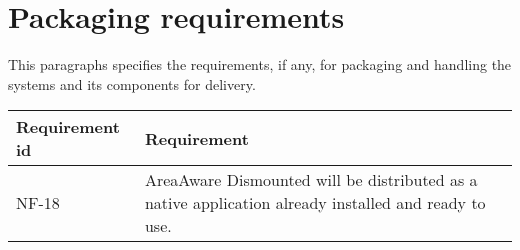 
\newpage
\section{Packaging requirements}
This paragraphs specifies the requirements, if any, for packaging and handling the systems and its components for delivery.

\begin{longtable}{| p{3.2cm} |  p{10cm} | }
	\hline
	\textbf{Requirement id} &  \textbf{Requirement } \\
	\hline
	NF-18 & AreaAware Dismounted will be distributed as a native application already installed and ready to use. \\
	\hline
\end{longtable}